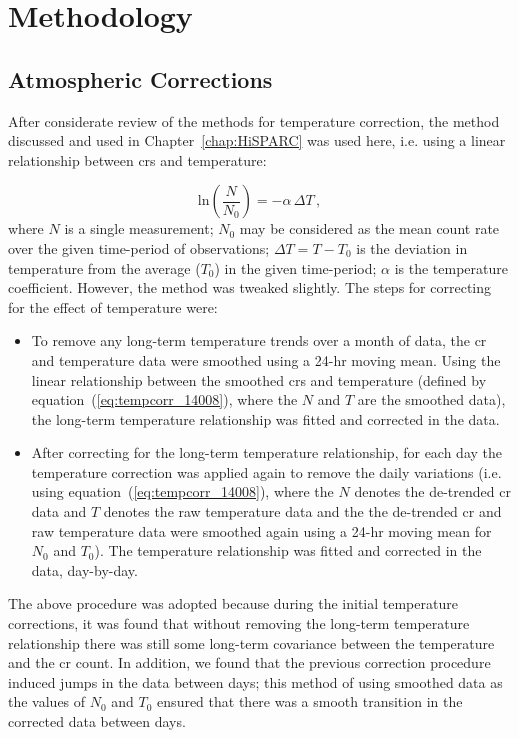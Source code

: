 \section{Methodology}\label{sec:HS_14008_methods}

\subsection{Atmospheric Corrections}

After considerate review of the methods for temperature correction, the method discussed and used in Chapter~\ref{chap:HiSPARC} was used here, i.e. using a linear relationship between \glspl{cr} and temperature:

\begin{equation}
\mathrm{ln} \left( \frac{N}{N_0} \right) = - \alpha \, \Delta T \, ,
\label{eq:tempcorr_14008}
\end{equation}
%
where $N$ is a single measurement; $N_0$ may be considered as the mean count rate over the given time-period of observations; $\Delta T = T - T_0$ is the deviation in temperature from the average ($T_0$) in the given time-period; $\alpha$ is the temperature coefficient. However, the method was tweaked slightly. The steps for correcting for the effect of temperature were:

\begin{itemize}
	\item{To remove any long-term temperature trends over a month of data, the \gls{cr} and temperature data were smoothed using a 24-hr moving mean. Using the linear relationship between the smoothed \glspl{cr} and temperature (defined by equation~(\ref{eq:tempcorr_14008}), where the $N$ and $T$ are the smoothed data), the long-term temperature relationship was fitted and corrected in the data.}

	\item{After correcting for the long-term temperature relationship, for each day the temperature correction was applied again to remove the daily variations (i.e. using equation~(\ref{eq:tempcorr_14008}), where the $N$ denotes the de-trended \gls{cr} data and $T$ denotes the raw temperature data and the the de-trended \gls{cr} and raw temperature data were smoothed again using a 24-hr moving mean for $N_0$ and $T_0$). The temperature relationship was fitted and corrected in the data, day-by-day.}
\end{itemize}


The above procedure was adopted because during the initial temperature corrections, it was found that without removing the long-term temperature relationship there was still some long-term covariance between the temperature and the \gls{cr} count. In addition, we found that the previous correction procedure induced jumps in the data between days; this method of using smoothed data as the values of $N_0$ and $T_0$ ensured that there was a smooth transition in the corrected data between days.

